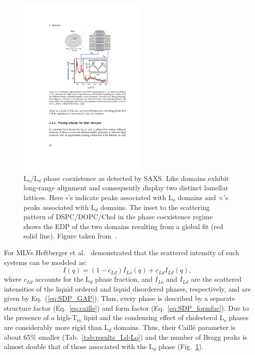 \documentclass[8.5pt,twoside,twocolumn]{article}
\begin{document}
\begin{figure} [t]
	\centering
	\includegraphics[height=9cm]{figures/SAXS_domains.pdf}
	\caption{L$_o$/L$_d$ phase coexistence as detected by SAXS. Like domains exhibit long-range alignment and consequently display two distinct lamellar lattices. Here $\circ$'s indicate peaks associated with L$_o$ domains and $\times$'s peaks associated with L$_d$ domains.  The inset to the scattering pattern of DSPC/DOPC/Chol in the phase coexistence regime shows the EDP of the two domains resulting from a global fit (red solid line). Figure taken from~\cite{Heftberger.2015b}.}
	\label{fig:SAXS_domains}
	
\end{figure}

For MLVs Heftberger et al.~\cite{Heftberger.2015} demonstrated that the scattered intensity of such systems can be modeled as:
\begin{equation}
	I(q)= \left(1-c_{Ld}\right) I_{Lo}(q)+ c_{Ld} I_{Ld}(q),
\end{equation}
where $c_{Ld}$ accounts for the L$_{d}$ phase fraction, and $I_{Lo}$ and $I_{Ld}$ are the scattered intensities of the liquid ordered and liquid disordered phases, respectively, and are given by Eq.~(\ref{eq:SDP_GAP}). Thus, every phase is described by a separate structure factor (Eq.~\ref{eq:caille}) and form factor (Eq.~\ref{eq:SDP_formfac}). Due to the presence of a high-T$_m$ lipid and the condensing effect of cholesterol L$_o$ phases are considerably more rigid than L$_d$ domains. Thus, their Caill\'{e} parameter is about 65\% smaller (Tab.~\ref{tab:results_Ld-Lo}) and the number of Bragg peaks is almost double that of those associated with the L$_d$ phase (Fig.~\ref{fig:SAXS_domains}).
\end{document}
